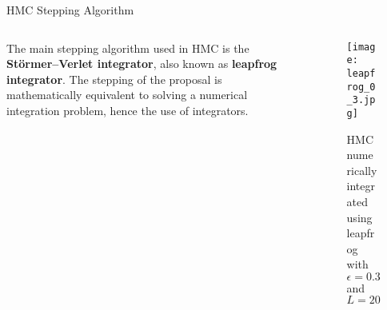 \begin{frame}{HMC Stepping Algorithm}
	\begin{columns}
		\begin{column}{0.6\textwidth}
			The main stepping algorithm used in HMC is the \textbf{Störmer–Verlet integrator}, also known as \textbf{leapfrog integrator}.
			\vfill
			The stepping of the proposal is mathematically equivalent to solving a numerical integration problem, hence the use of integrators.
		\end{column}
		\begin{column}{0.4\textwidth}
			\begin{figure}
				\texttt{[image: leapfrog\_0\_3.jpg]}
				\caption{HMC numerically integrated using leapfrog with $\epsilon = 0.3$ and $L = 20$}
			\end{figure}
		\end{column}
	\end{columns}
\end{frame}



